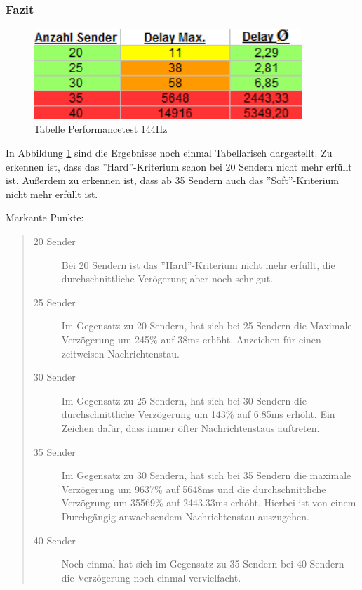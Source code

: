 \subsubsection{Fazit}
\begin{figure}[htH]
\centering
\includegraphics[width=0.9\textwidth]{backend/Tabelle_Performance_144hz.PNG}
\caption{Tabelle Performancetest 144Hz}
\label{backfig19}
\end{figure}
In Abbildung \ref{backfig19} sind die Ergebnisse noch einmal Tabellarisch dargestellt.
Zu erkennen ist, dass das ''Hard''-Kriterium schon bei 20 Sendern nicht mehr erfüllt ist.
Außerdem zu erkennen ist, dass ab 35 Sendern auch das ''Soft''-Kriterium nicht mehr erfüllt ist.

Markante Punkte:

\begin{quote}
  \begin{description}
  \item[20 Sender]
  Bei 20 Sendern ist das ''Hard''-Kriterium nicht mehr erfüllt, die durchschnittliche Verögerung aber noch sehr gut.

  \item[25 Sender]
  Im Gegensatz zu 20 Sendern, hat sich bei 25 Sendern die Maximale Verzögerung um 245\% auf 38ms erhöht. Anzeichen für einen zeitweisen Nachrichtenstau.

  \item[30 Sender]
  Im Gegensatz zu 25 Sendern, hat sich bei 30 Sendern die durchschnittliche Verzögerung um 143\% auf 6.85ms erhöht. Ein Zeichen dafür, dass immer öfter Nachrichtenstaus auftreten.

  \item[35 Sender]
  Im Gegensatz zu 30 Sendern, hat sich bei 35 Sendern die maximale Verzögerung um 9637\% auf 5648ms und die durchschnittliche Verzögrung um 35569\% auf 2443.33ms erhöht. Hierbei ist von einem Durchgängig anwachsendem Nachrichtenstau auszugehen.

  \item[40 Sender]
  Noch einmal hat sich im Gegensatz zu 35 Sendern bei 40 Sendern die Verzögerung noch einmal vervielfacht.
  \end{description}
\end{quote}

